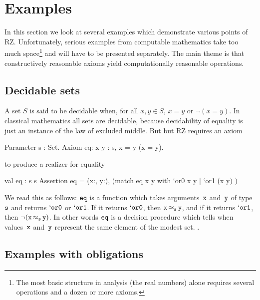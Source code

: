 \section{Examples}
\label{sec:examples}

In this section we look at several examples which demonstrate various
points of RZ. Unfortunately, serious examples from computable
mathematics take too much space\footnote{The most basic structure
  in analysis (the real numbers) alone 
  requires several operations and a dozen or more axioms.} and will have to
be presented separately. The main theme is that constructively
reasonable axioms yield computationally reasonable operations.

\subsection{Decidable sets}
\label{sec:decidable-sets}

A set $S$ is said to be decidable when, for all $x, y \in S$, $x = y$
or $\lnot (x = y)$. In classical mathematics all sets are decidable, 
\iflong
because decidability of equality is just an instance of the law of
excluded middle.  But
\else
but
\fi %
RZ requires an axiom
%
\begin{source}
Parameter s : Set.
Axiom eq: \iForall x y : s, x = y \iOr \iNot (x = y).
\end{source}
%
to produce a realizer for equality
%
\begin{source}
val eq : s \iTo s \iTo [`or0 | `or1]
Assertion eq = \iForall (x:, y:),
                   (match eq x y with
                      `or0 \iImply x  y
                    | `or1 \iImply \iNot (x  y) )
\end{source}
%
We read this as follows: $\f{eq}$ is a function which takes
arguments~$\f{x}$ and~$\f{y}$ of type~$\f{s}$ and returns
$\mathtt{`or0}$ or $\mathtt{`or1}$. If it returns $\mathtt{`or0}$,
then $\oper{\f{s}}{\f{x}}{\f{y}}$, and if it returns
$\mathtt{`or1}$, then $\onot{(\oper{\f{s}}{\f{x}}{\f{y}})}$. In
other words $\f{eq}$ is a decision procedure%
\iflong
which tells when
values~$\f{x}$ and~$\f{y}$ represent the same element of the modest
set.
\else %
.
\fi %

\iflong
\subsection{Examples with obligations}
\label{sec:exampl-with-oblig}

